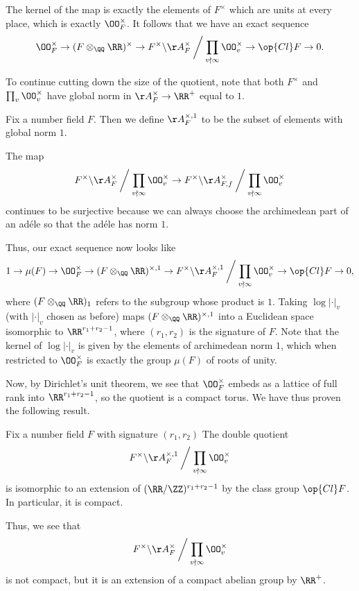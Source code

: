 \documentclass[../notes.tex]{subfiles}
\begin{document}
\begin{remark}
	The kernel of the map is exactly the elements of $F^\times$ which are units at every place, which is exactly $\OO_F^\times$. It follows that we have an exact sequence
	\[\OO_F^\times\to(F\otimes_\QQ\RR)^\times\to F^\times\backslash\AA_F^\times\mathbin{\bigg/}\prod_{v\nmid\infty}\OO_v^\times\to\op{Cl}F\to0.\]
\end{remark}
To continue cutting down the size of the quotient, note that both $F^\times$ and $\prod_v\OO_v^\times$ have global norm in $\AA_F^\times\to\RR^+$ equal to $1$.
\begin{notation}
	Fix a number field $F$. Then we define $\AA_{F}^{\times,1}$ to be the subset of elements with global norm $1$.
\end{notation}
\begin{remark}
	The map
	\[F^\times\backslash\AA_F^\times\mathbin{\bigg/}\prod_{v\nmid\infty}\OO_v^\times\to F^\times\backslash\AA_{F,f}^\times\mathbin{\bigg/}\prod_{v\nmid\infty}\OO_v^\times\]
	continues to be surjective because we can always choose the archimedean part of an ad\'ele so that the ad\'ele has norm $1$.
\end{remark}
Thus, our exact sequence now looks like
\[1\to\mu(F)\to\OO_F^\times\to(F\otimes_\QQ\RR)^{\times,1}\to F^\times\backslash\AA_F^{\times,1}\mathbin{\bigg/}\prod_{v\nmid\infty}\OO_v^\times\to\op{Cl}F\to0,\]
where $(F\otimes_\QQ\RR)_1$ refers to the subgroup whose product is $1$. Taking $\log\left|\cdot\right|_v$ (with $\left|\cdot\right|_v$ chosen as before) maps $(F\otimes_\QQ\RR)^{\times,1}$ into a Euclidean space isomorphic to $\RR^{r_1+r_2-1}$, where $(r_1,r_2)$ is the signature of $F$. Note that the kernel of $\log\left|\cdot\right|_v$ is given by the elements of archimedean norm $1$, which when restricted to $\OO_F^\times$ is exactly the group $\mu(F)$ of roots of unity.

Now, by Dirichlet's unit theorem, we see that $\OO_F^\times$ embeds as a lattice of full rank into $\RR^{r_1+r_2-1}$, so the quotient is a compact torus. We have thus proven the following result.
\begin{theorem} \label{thm:idele-class-group}
	Fix a number field $F$ with signature $(r_1,r_2)$ The double quotient
	\[F^\times\backslash\AA_F^{\times,1}\mathbin{\bigg/}\prod_{v\nmid\infty}\OO_v^\times\]
	is isomorphic to an extension of $(\RR/\ZZ)^{r_1+r_2-1}$ by the class group $\op{Cl}F$. In particular, it is compact.
\end{theorem}
\begin{remark}
	Thus, we see that
	\[F^\times\backslash\AA_F^{\times}\mathbin{\bigg/}\prod_{v\nmid\infty}\OO_v^\times\]
	is not compact, but it is an extension of a compact abelian group by $\RR^+$.
\end{remark}
\end{document}
